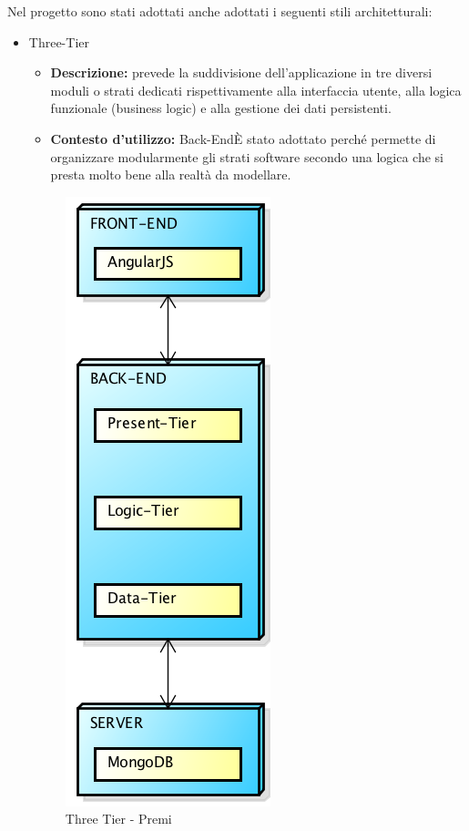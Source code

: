 Nel progetto sono stati adottati anche adottati i seguenti stili architetturali:
\begin{itemize}
	\item Three-Tier
	\begin{itemize}
		\item \textbf{Descrizione:} prevede la suddivisione dell'applicazione in tre diversi moduli o strati dedicati rispettivamente alla interfaccia utente, alla logica funzionale (\gls{business} logic) e alla gestione dei dati persistenti.
		\item \textbf{Contesto d'utilizzo:} \gls{Back-End}\newline È stato adottato perché permette di organizzare modularmente gli strati software secondo una logica che si presta molto bene alla realtà da modellare.
	\end{itemize}
	\begin{figure}[h]
		\centering
		\includegraphics[width=0.2\linewidth]{img/architettura_generale_three}
		\caption[Three Tier - Premi]{Three Tier - Premi}
	\end{figure}
\end{itemize}